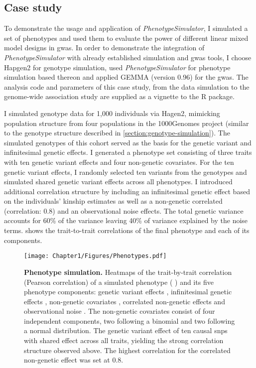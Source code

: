 \subsection{Case study}
To demonstrate the usage and application of \textit{PhenotypeSimulator}, I simulated a set of phenotypes and used them to evaluate the power of different linear mixed model designs in \gls{gwas}. In order to demonstrate the integration of \textit{PhenotypeSimulator} with already established simulation and \gls{gwas} tools, I choose Hapgen2 \citep{Su2011} for genotype simulation, used \textit{PhenotypeSimulator} for phenotype simulation based thereon and applied GEMMA (version 0.96) \citep{Zhou2014} for the \gls{gwas}. 
The analysis code and parameters of this case study, from the data simulation to the genome-wide association study are supplied as a vignette to the R package. 

I simulated genotype data for 1,000 individuals via Hagen2, mimicking population structure from four populations in the 1000Genomes project \citep{1000Genomes2012} (similar to the genotype structure described in \cref{section:genotype-simulation}). The simulated genotypes of this cohort served as the basis for the genetic variant and infinitesimal genetic effects. I generated a phenotype set consisting of three traits with ten genetic variant effects and four non-genetic covariates. For the ten genetic variant effects, I randomly selected ten variants from the genotypes and simulated shared genetic variant effects across all phenotypes. I introduced additional correlation structure by including an infinitesimal genetic effect based on the individuals' kinship estimates as well as a non-genetic correlated (correlation: \num{0.8}) and an observational noise effects. The total genetic variance accounts for \num{60}\% of the variance leaving \num{40}\% of variance explained by the noise terms.  shows the trait-to-trait correlations of the final phenotype and each of its components.

\begin{figure}[h!]
	\centering
	\texttt{[image: Chapter1/Figures/Phenotypes.pdf]}
	\caption[\textbf{Phenotype simulation.}]{\textbf{Phenotype simulation.} Heatmaps of the trait-by-trait correlation (Pearson correlation) of a simulated phenotype ( ) and its five phenotype components: genetic variant effects  , infinitesimal genetic effects , non-genetic covariates , correlated non-genetic effects  and observational noise \tmat{\Psi}. The non-genetic covariates consist of four independent components, two following a binomial and two following a normal distribution. The genetic variant effect of ten causal \glspl{snp} with shared effect across all traits, yielding the strong correlation structure observed above. The highest correlation for the correlated non-genetic effect was set at \num{0.8}.}
	\label{fig:simulation}
\end{figure}

